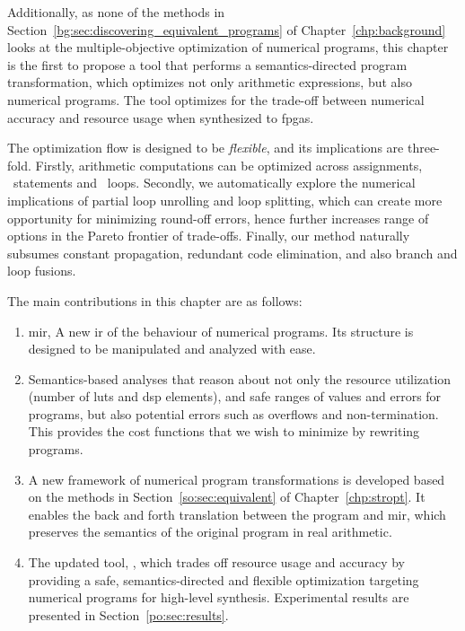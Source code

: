 Additionally, as none of the methods in
Section~\ref{bg:sec:discovering_equivalent_programs} of
Chapter~\ref{chp:background} looks at the multiple-objective optimization of
numerical programs, this chapter is the first to propose a tool that performs a
semantics-directed program transformation, which optimizes not only arithmetic
expressions, but also numerical programs.  The tool optimizes for the trade-off
between numerical accuracy and resource usage when synthesized to \glspl{fpga}.

The optimization flow is designed to be \emph{flexible}, and its implications
are three-fold.  Firstly, arithmetic computations can be optimized across
assignments, \iflit~statements and \whilelit~loops.  Secondly, we automatically
explore the numerical implications of partial loop unrolling and loop
splitting, which can create more opportunity for minimizing round-off errors,
hence further increases range of options in the Pareto frontier of trade-offs.
Finally, our method naturally subsumes constant propagation, redundant code
elimination, and also branch and loop fusions.

The main contributions in this chapter are as follows:
\begin{enumerate}

    \item \Acrfull{mir}, A new \gls{ir} of the behaviour of numerical programs.
    Its structure is designed to be manipulated and analyzed with ease.

    \item Semantics-based analyses that reason about not only the resource
    utilization (number of \glspl{lut} and \gls{dsp} elements), and safe ranges
    of values and errors for programs, but also potential errors such as
    overflows and non-termination.  This provides the cost functions that we
    wish to minimize by rewriting programs.

    \item A new framework of numerical program transformations is
    developed based on the methods in Section~\ref{so:sec:equivalent} of
    Chapter~\ref{chp:stropt}.  It enables the back and forth translation
    between the program and \gls{mir}, which preserves the semantics of the
    original program in real arithmetic.

    \item The updated tool, \soap, which trades off resource usage and accuracy
    by providing a safe, semantics-directed and flexible optimization targeting
    numerical programs for high-level synthesis.  Experimental results are
    presented in Section~\ref{po:sec:results}.

\end{enumerate}

